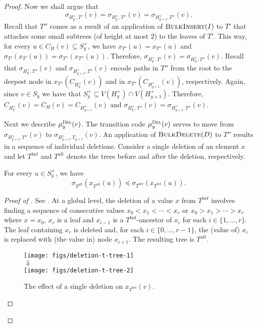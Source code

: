 \documentclass[kpfonts]{patmorin}
\let\preceq\preccurlyeq
\begin{document}
\begin{proof}


  Now we shall argue that
  \[
  \sigma_{H^+_{y},T'}(v) = \sigma_{H^+_{y},T''}(v) = \sigma_{H^+_{y+1},T''}(v).
  \]
  Recall that $T''$ comes as a result of an application of $\textsc{BulkInsert}(I)$ to $T'$ 
  that attaches some small subtrees (of height at most $2$)
  to the leaves of $T'$. 
  This way, for every $u \in C_H(v) \subseteq S^+_y$, we have $x_{T'}(u) = x_{T''}(u)$ and 
  $\sigma_{T'}(x_{T'}(u)) = \sigma_{T''}(x_{T''}(u))$.
  Therefore, 
  $\sigma_{H^+_{y},T'}(v) =  \sigma_{H^+_{y},T''}(v)$.
  Recall that $\sigma_{H^+_{y},T''}(v)$ and $\sigma_{H^+_{y+1},T''}(v)$ encode paths in $T''$ from the root to the deepest node in $x_{T''}(C_{H^+_{y}}(v))$ and in $x_{T''}(C_{H^+_{y+1}}(v))$, respectively. 
  Again, since $v\in S_y$ we have that $S^+_y \subseteq V(H^+_y) \cap V(H^+_{y+1})$. Therefore, 
  $C_{H^+_{y}}(v) = C_H(v) = C_{H^+_{y+1}}(v)$ and $\sigma_{H^+_{y},T''}(v) =\sigma_{H^+_{y+1},T''}(v)$.

  Next we describe $\mu_y^{\textsc{Del}}(v)$. 
  The transition code $\mu_y^{\textsc{Del}}(v)$ serves to move 
  from $\sigma_{H^+_{y+1},T''}(v)$ to $\sigma_{H^+_{y+1},T_{y+1}}(v)$. 
  An application of $\textsc{BulkDelete}(D)$ to $T''$ results in 
  a sequence of individual deletions.
  Consider a single deletion of an element $x$ and let $T^{\text{bef}}$ and $T^{\text{aft}}$ denote the trees before and after the deletion, respectively.

  \begin{clm}
  For every $u\in S^+_y$, we have
  \[
  \sigma_{T^{\text{aft}}}(x_{T^{\text{aft}}}(u))\preceq\sigma_{T^{\text{bef}}}(x_{T^{\text{bef}}}(u)).
  \]
  \end{clm}

  \begin{proof}[Proof of ]
    See .  At a global level, the deletion of a value $x$ from $T^{\text{bef}}$ involves finding a sequence of consecutive values $x_0<x_1<\cdots<x_r$ or $x_0>x_1>\cdots>x_r$ where $x=x_0$, $x_r$ is a leaf and $x_{i-1}$ is a $T^{\text{bef}}$-ancestor of $x_{i}$ for each $i\in\{1,\ldots,r\}$.  The leaf containing $x_r$ is deleted and, for each $i\in\{0,\ldots,r-1\}$, the (value of) $x_i$ is replaced with (the value in) node $x_{i+1}$. 
    The resulting tree is $T^{\text{aft}}$.    
    \begin{figure}
      \begin{center}
        \texttt{[image: figs/deletion-t-tree-1]}\\[1ex]
        $\Downarrow$\\[1ex]
        \texttt{[image: figs/deletion-t-tree-2]}
      \end{center}
      \caption{The effect of a single deletion on $x_{T^{\text{bef}}}(v)$.}
    \end{figure}


\end{proof}
\end{proof}
\end{document}
